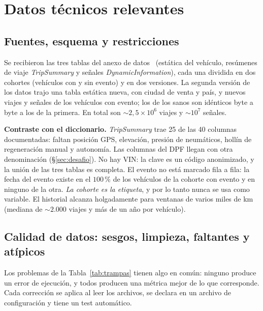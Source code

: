\section{Datos técnicos relevantes}
\label{sec:datos}

\subsection{Fuentes, esquema y restricciones}

Se recibieron las tres tablas del anexo de datos~\cite{ford} (estática del vehículo, resúmenes de viaje
\emph{TripSummary} y señales \emph{DynamicInformation}), cada una dividida en dos cohortes (vehículos con y sin evento) y en
dos versiones. La segunda versión de los datos trajo una tabla estática nueva, con ciudad de venta y país, y nuevos viajes y señales de los
vehículos con evento; los de los sanos son idénticos byte a byte a los de la primera. En total son $\sim 2{,}5\times10^6$
viajes y $\sim 10^7$ señales.

\textbf{Contraste con el diccionario.} \emph{TripSummary} trae 25 de las 40 columnas documentadas: faltan posición GPS,
elevación, presión de neumáticos, hollín de regeneración manual y autonomía. Las columnas del DPF llegan con otra
denominación (\S\ref{sec:desafio}). No hay VIN: la clave es un código anonimizado, y la unión de las tres tablas es
completa. El evento no está marcado fila a fila: la fecha del evento existe en el $100\,\%$ de los vehículos de la cohorte con
evento y en ninguno de la otra. \emph{La cohorte es la etiqueta}, y por lo tanto nunca se usa como variable. El historial
alcanza holgadamente para ventanas de varios miles de km (mediana de $\sim 2.000$ viajes y más de un año por vehículo).

\subsection{Calidad de datos: sesgos, limpieza, faltantes y atípicos}
\label{sec:trampas}

Los problemas de la Tabla~\ref{tab:trampas} tienen algo en común: ninguno produce un error de ejecución, y todos producen
una métrica mejor de lo que corresponde. Cada corrección se aplica al leer los archivos, se declara en un archivo de
configuración y tiene un test automático.

